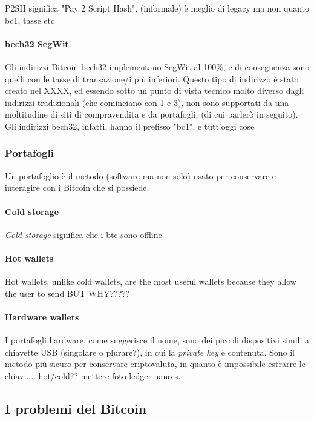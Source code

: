 \documentclass {article}
\begin{document}
P2SH significa "Pay 2 Script Hash", (informale) è meglio di legacy ma non quanto bc1, tasse etc


\paragraph {bech32 SegWit}


Gli indirizzi Bitcoin bech32 implementano SegWit al 100\%, e di conseguenza sono quelli con le tasse di transazione/i più inferiori.
Questo tipo di indirizzo è stato creato nel XXXX, ed essendo sotto un punto di vista tecnico molto diverso dagli indirizzi tradizionali (che cominciano con 1 e 3), non sono supportati da una moltitudine di siti di compravendita e da portafogli, (di cui parlerò in seguito).
Gli indirizzi bech32, infatti, hanno il prefisso "bc1", e tutt'oggi cose


\subsubsection {Portafogli}


Un portafoglio è il metodo (software ma non solo) usato per conservare e interagire con i Bitcoin che si possiede.


\paragraph {Cold storage}


\textit{Cold storage} significa che i btc sono offline


\paragraph {Hot wallets}


Hot wallets, unlike cold wallets, are the most useful wallets because they allow the user to send BUT WHY?????


\paragraph {Hardware wallets}


I portafogli hardware, come suggerisce il nome, sono dei piccoli dispositivi simili a chiavette USB (singolare o plurare?), in cui la \textit{private key} è contenuta.
Sono il metodo più sicuro per conservare criptovaluta, in quanto è impossibile estrarre le chiavi.... hot/cold?? mettere foto ledger nano s.


\subsection {I problemi del Bitcoin}
\end{document}
